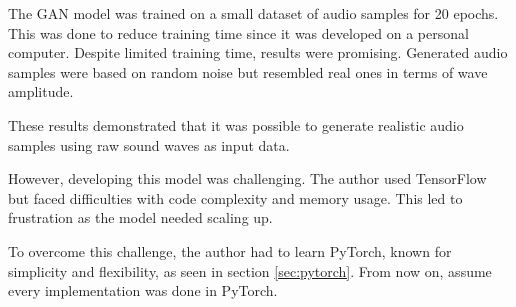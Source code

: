 The \ac{GAN} model was trained on a small dataset of audio samples for 20 epochs. This was done to reduce training time since it was developed on a personal computer. Despite limited training time, results were promising. Generated audio samples were based on random noise but resembled real ones in terms of wave amplitude.

These results demonstrated that it was possible to generate realistic audio samples using raw sound waves as input data.

However, developing this model was challenging. The author used TensorFlow but faced difficulties with code complexity and memory usage. This led to frustration as the model needed scaling up.

To overcome this challenge, the author had to learn PyTorch, known for simplicity and flexibility, as seen in section \ref{sec:pytorch}. From now on, assume every implementation was done in PyTorch.